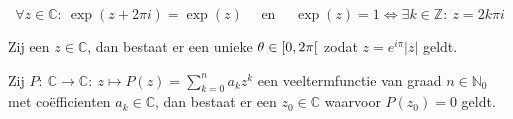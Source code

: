 \documentclass[main.tex]{subfiles}
\begin{document}
\begin{bpr}
  \[ \forall z\in \mathbb{C}:\ \exp(z+2\pi i) = \exp(z) \quad\text{ en }\quad \exp(z) = 1 \Leftrightarrow \exists k\in \mathbb{Z}:\ z = 2k\pi i \]
\end{bpr}

\begin{bpr}
  Zij een $z\in \mathbb{C}$, dan bestaat er een unieke $\theta \in \interval[open right]{0}{2\pi}$ zodat $z=e^{i\pi}|z|$ geldt.
\end{bpr}

\begin{bst}
  Zij $P:\ \mathbb{C} \rightarrow \mathbb{C}:\ z \mapsto P(z) = \sum_{k=0}^{n}a_{k}z^{k}$ een veeltermfunctie van graad $n\in \mathbb{N}_{0}$ met co\"efficienten $a_{k}\in \mathbb{C}$, dan bestaat er een $z_{0}\in \mathbb{C}$ waarvoor $P(z_{0})=0$ geldt.
\end{bst}
\end{document}
